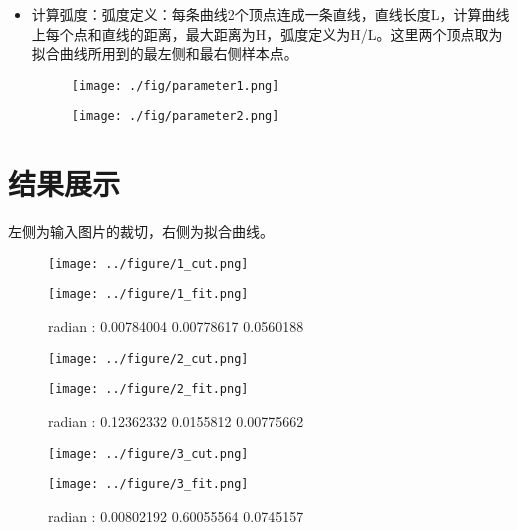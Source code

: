 \documentclass{article}
\begin{document}
\begin{itemize}
\item
  计算弧度：弧度定义：每条曲线2个顶点连成一条直线，直线长度L，计算曲线上每个点和直线的距离，最大距离为H，弧度定义为H/L。这里两个顶点取为拟合曲线所用到的最左侧和最右侧样本点。\\
  \begin{figure}[H]
  \begin{minipage}{0.5\linewidth}
  \centerline{\texttt{[image: ./fig/parameter1.png]}}
  \end{minipage}
  \hfill
  \begin{minipage}{0.5\linewidth}
  \centerline{\texttt{[image: ./fig/parameter2.png]}}
  \end{minipage}
  \end{figure}
\end{itemize}


\section{结果展示}

左侧为输入图片的裁切，右侧为拟合曲线。

\begin{figure}[H]
\begin{minipage}{0.5\linewidth}
  \centerline{\texttt{[image: ../figure/1\_cut.png]}}
\end{minipage}
\hfill
\begin{minipage}{0.5\linewidth}
  \centerline{\texttt{[image: ../figure/1\_fit.png]}}
\end{minipage}
\caption{radian : 0.00784004 0.00778617 0.0560188 }
\end{figure}


\begin{figure}[H]
\begin{minipage}{0.48\linewidth}
  \centerline{\texttt{[image: ../figure/2\_cut.png]}}
\end{minipage}
\hfill
\begin{minipage}{0.48\linewidth}
  \centerline{\texttt{[image: ../figure/2\_fit.png]}}
\end{minipage}
\caption{radian : 0.12362332 0.0155812  0.00775662}
\end{figure}


\begin{figure}[H]
\begin{minipage}{0.48\linewidth}
  \centerline{\texttt{[image: ../figure/3\_cut.png]}}
\end{minipage}
\hfill
\begin{minipage}{0.48\linewidth}
  \centerline{\texttt{[image: ../figure/3\_fit.png]}}
\end{minipage}
\caption{radian : 0.00802192 0.60055564 0.0745157}
\end{figure}
\end{document}
